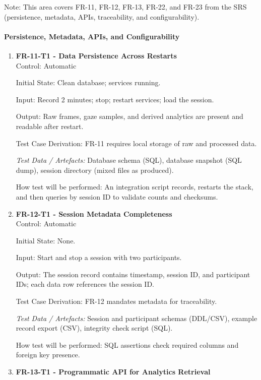 \documentclass[12pt, titlepage]{article}
\begin{document}
Note: This area covers FR-11, FR-12, FR-13, FR-22, and FR-23 from the SRS (persistence, metadata, APIs, traceability, and configurability).

\paragraph{Persistence, Metadata, APIs, and Configurability}

\begin{enumerate}

\item \textbf{FR-11-T1 - Data Persistence Across Restarts} \\

Control: Automatic

Initial State: Clean database; services running.

Input: Record 2 minutes; stop; restart services; load the session.

Output: Raw frames, gaze samples, and derived analytics are present and readable after restart.

Test Case Derivation: FR-11 requires local storage of raw and processed data.

\textit{Test Data / Artefacts:} Database schema (SQL), database snapshot (SQL dump), session directory (mixed files as produced).

How test will be performed: An integration script records, restarts the stack, and then queries by session ID to validate counts and checksums.

\item \textbf{FR-12-T1 - Session Metadata Completeness} \\

Control: Automatic

Initial State: None.

Input: Start and stop a session with two participants.

Output: The session record contains timestamp, session ID, and participant IDs; each data row references the session ID.

Test Case Derivation: FR-12 mandates metadata for traceability.

\textit{Test Data / Artefacts:} Session and participant schemas (DDL/CSV), example record export (CSV), integrity check script (SQL).

How test will be performed: SQL assertions check required columns and foreign key presence.

\item \textbf{FR-13-T1 - Programmatic API for Analytics Retrieval} \\


\end{enumerate}
\end{document}

